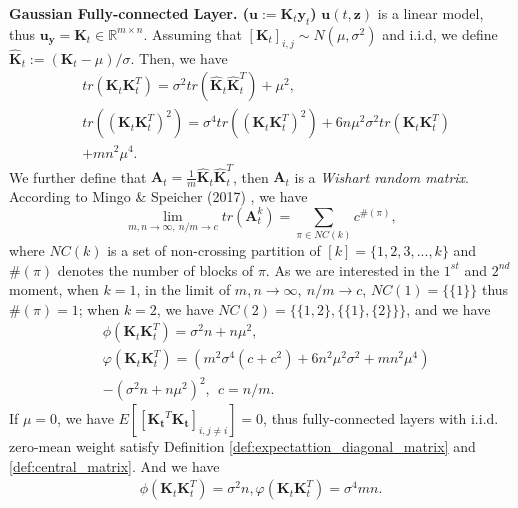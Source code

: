 \documentclass[10pt,journal,compsoc]{IEEEtran}
\begin{document}
\textbf{Gaussian Fully-connected Layer. ($\mathbf{u}:=\mathbf{K}_t\mathbf{y}_t$)} $\mathbf{u}(t,\mathbf{z})$ is a linear model, thus $\mathbf{u_y} = \mathbf{K}_t \in \mathbb{R}^{m\times n}$. Assuming that $[\mathbf{K}_t]_{i,j}\sim N(\mu, \sigma^2)$ and i.i.d, we define $\hat{\mathbf{K}}_t := (\mathbf{K}_t - \mu)/\sigma$. Then, we have
\begin{equation}
\begin{split}
    &tr(\mathbf{K}_t\mathbf{K}_t^T) = \sigma^2tr(\hat{\mathbf{K}}_t\hat{\mathbf{K}}_t^T) + \mu^2,\\
    &tr\left((\mathbf{K}_t\mathbf{K}_t^T)^2\right) = \sigma^4tr\left((\mathbf{K}_t\mathbf{K}_t^T)^2\right) + 6n\mu^2\sigma^2tr\left(\mathbf{K}_t\mathbf{K}_t^T\right)\\
    & +mn^2\mu^4.
\end{split}
\label{equ:target_fc}
\end{equation}
We further define that $\mathbf{A}_t=\frac{1}{m}\hat{\mathbf{K}}_t\hat{\mathbf{K}}_t^T$, then $\mathbf{A}_t$ is a \textit{Wishart random matrix}. According to Mingo \& Speicher (2017) \cite{mingo2017free}, we have
\begin{equation}
    \lim_{m,n\rightarrow \infty,~n/m\rightarrow c}tr(\mathbf{A}_t^k) = \sum_{\pi\in NC(k)}c^{\#(\pi)},
\end{equation}
where $NC(k)$ is a set of non-crossing partition of $[k]=\{1, 2, 3,...,k\}$ and $\#(\pi)$ denotes the number of blocks of $\pi$. As we are interested in the $1^{st}$ and $2^{nd}$ moment, when $k=1$, in the limit of  $m,n\rightarrow \infty,~n/m\rightarrow c$, $NC(1) = \{\{1\}\} $ thus $\#(\pi)=1$; when $k=2$, we have $NC(2) = \{\{1, 2\}, \{\{1\},\{2\}\}\}$, and we have
\begin{equation}
\begin{split}
    & \phi(\mathbf{K}_t\mathbf{K}_t^T) = \sigma^2 n+n\mu^2,\\
    & \varphi(\mathbf{K}_t\mathbf{K}_t^T) = \left(m^2\sigma^4(c+c^2)+6n^2\mu^2\sigma^2+mn^2\mu^4\right)\\
    & -(\sigma^2 n+n\mu^2)^2,~~c = n/m.
\end{split}
\label{equ:eig_fc}   
\end{equation}
If $\mu=0$, we have $E[[\mathbf{K_t}^T\mathbf{K_t}]_{i,j\neq i}]= 0$, thus fully-connected layers with i.i.d. zero-mean weight satisfy Definition \ref{def:expectattion_diagonal_matrix}  and \ref{def:central_matrix}. And we have
\begin{equation}
\begin{split}
    \phi(\mathbf{K}_t\mathbf{K}_t^T) = \sigma^2 n, \varphi(\mathbf{K}_t\mathbf{K}_t^T) = \sigma^4 mn.
\end{split}
\end{equation}
\end{document}
